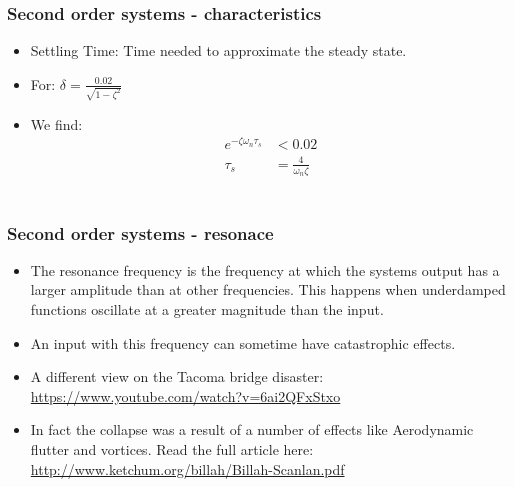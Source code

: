 \begin{frame}
\frametitle{Second order systems - characteristics}
\begin{itemize}
\item Settling Time: Time needed to approximate the steady state.
\item For: $\delta = \frac{0.02}{\sqrt{1-\zeta^2}}$
\item We find:
\vspace{-0.55cm}
\begin{align*}
 e^{-\zeta\omega_n\tau_s} &< 0.02
\\\tau_s &= \frac{4}{\omega_n\zeta}
\end{align*}
\\ \begin{figure}
\end{figure}
\end{itemize}
\end{frame}

\begin{frame}
\frametitle{Second order systems - resonace}
\begin{itemize}
\item The resonance frequency is the frequency at which the systems output has a larger amplitude than at other frequencies. This happens when underdamped functions oscillate at a greater magnitude than the input.
\item An input with this frequency can sometime have catastrophic effects.
\item A different view on the Tacoma bridge disaster: \url{https://www.youtube.com/watch?v=6ai2QFxStxo}
\item In fact the collapse was a result of a number of effects like Aerodynamic flutter and vortices. Read the full article here: \url{http://www.ketchum.org/billah/Billah-Scanlan.pdf}
\end{itemize}
\end{frame}


